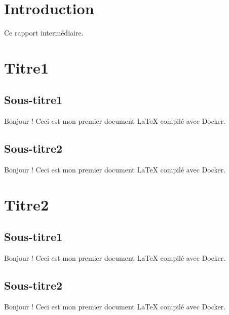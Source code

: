 \documentclass[12pt,a4paper]{report}
\begin{document}
\clearpage
\hypersetup{pageanchor=true}

\tableofcontents

\clearpage
\chapter*{Introduction}
Ce rapport intermédiaire.

\chapter{Titre1}
\section{Sous-titre1}
Bonjour ! Ceci est mon premier document LaTeX compilé avec Docker.
\section{Sous-titre2}
Bonjour ! Ceci est mon premier document LaTeX compilé avec Docker.

\chapter{Titre2}
\section{Sous-titre1}
Bonjour ! Ceci est mon premier document LaTeX compilé avec Docker.
\section{Sous-titre2}
Bonjour ! Ceci est mon premier document LaTeX compilé avec Docker.
\end{document}
